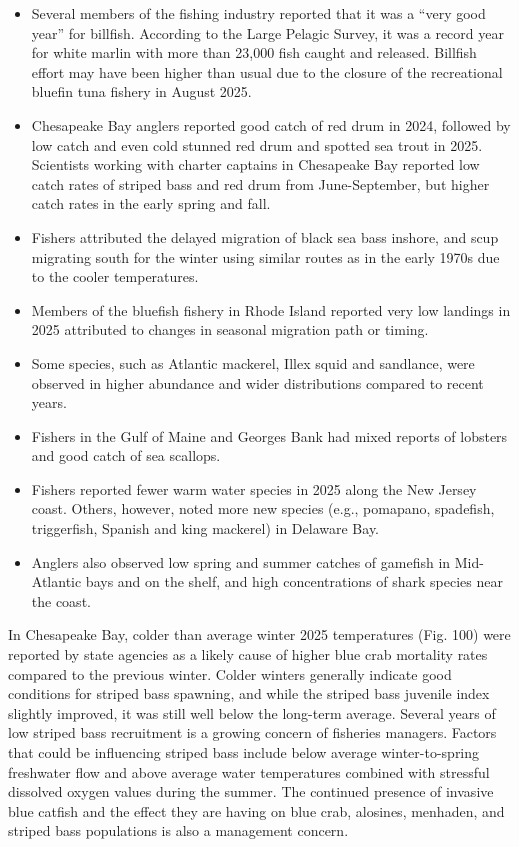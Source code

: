 \documentclass[
  10pt,
]{article}
\providecommand{\tightlist}{%
  \setlength{\itemsep}{0pt}\setlength{\parskip}{0pt}}
\begin{document}
\begin{itemize}
\tightlist
\item
  Several members of the fishing industry reported that it was a ``very
  good year'' for billfish. According to the Large Pelagic Survey, it
  was a record year for white marlin with more than 23,000 fish caught
  and released. Billfish effort may have been higher than usual due to
  the closure of the recreational bluefin tuna fishery in August 2025.
\item
  Chesapeake Bay anglers reported good catch of red drum in 2024,
  followed by low catch and even cold stunned red drum and spotted sea
  trout in 2025. Scientists working with charter captains in Chesapeake
  Bay reported low catch rates of striped bass and red drum from
  June-September, but higher catch rates in the early spring and fall.
\item
  Fishers attributed the delayed migration of black sea bass inshore,
  and scup migrating south for the winter using similar routes as in the
  early 1970s due to the cooler temperatures.
\item
  Members of the bluefish fishery in Rhode Island reported very low
  landings in 2025 attributed to changes in seasonal migration path or
  timing.
\item
  Some species, such as Atlantic mackerel, Illex squid and sandlance,
  were observed in higher abundance and wider distributions compared to
  recent years.
\item
  Fishers in the Gulf of Maine and Georges Bank had mixed reports of
  lobsters and good catch of sea scallops.
\item
  Fishers reported fewer warm water species in 2025 along the New Jersey
  coast. Others, however, noted more new species (e.g., pomapano,
  spadefish, triggerfish, Spanish and king mackerel) in Delaware Bay.
\item
  Anglers also observed low spring and summer catches of gamefish in
  Mid-Atlantic bays and on the shelf, and high concentrations of shark
  species near the coast.
\end{itemize}

In Chesapeake Bay, colder than average winter 2025 temperatures (Fig.
100) were reported by state agencies as a likely cause of higher blue
crab mortality rates compared to the previous winter. Colder winters
generally indicate good conditions for striped bass spawning, and while
the striped bass juvenile index slightly improved, it was still well
below the long-term average. Several years of low striped bass
recruitment is a growing concern of fisheries managers. Factors that
could be influencing striped bass include below average winter-to-spring
freshwater flow and above average water temperatures combined with
stressful dissolved oxygen values during the summer. The continued
presence of invasive blue catfish and the effect they are having on blue
crab, alosines, menhaden, and striped bass populations is also a
management concern.
\end{document}

